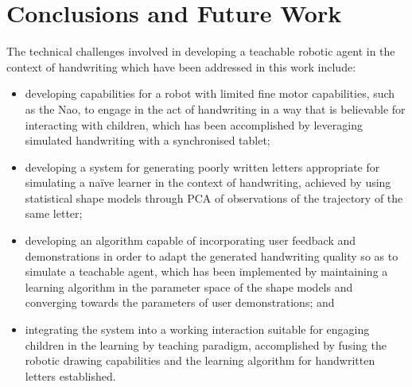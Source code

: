 \documentclass{sig-alternate}
\begin{document}


\section{Conclusions and Future Work}


The technical challenges involved in developing a teachable robotic agent in the context of handwriting which have been addressed in this work include:

\begin{itemize}

    \item developing capabilities for a robot with limited fine motor
        capabilities, such as the Nao, to engage in the act of handwriting in a
        way that is believable for interacting with children, which has been
        accomplished by leveraging simulated handwriting with a synchronised
        tablet;

    \item developing a system for generating poorly written letters appropriate
        for simulating a na\"ive learner in the context of handwriting, achieved
        by using statistical shape models through PCA of observations of the
        trajectory of the same letter;

    \item developing an algorithm capable of incorporating user feedback and
        demonstrations in order to adapt the generated handwriting quality so as
        to simulate a teachable agent, which has been implemented by maintaining
        a learning algorithm in the parameter space of the shape models and
        converging towards the parameters of user demonstrations; and

    \item integrating the system into a working interaction suitable for
        engaging children in the learning by teaching paradigm, accomplished by
        fusing the robotic drawing capabilities and the learning algorithm for
        handwritten letters established.

\end{itemize}
\end{document}
